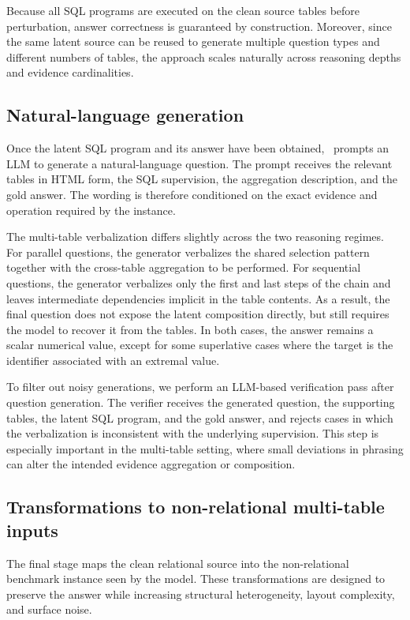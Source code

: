 Because all SQL programs are executed on the clean source tables before perturbation, answer correctness is guaranteed by construction. Moreover, since the same latent source can be reused to generate multiple question types and different numbers of tables, the approach scales naturally across reasoning depths and evidence cardinalities.

\subsection{Natural-language generation}
\label{subsec:nl-generation}

Once the latent SQL program and its answer have been obtained, \name\ prompts an LLM to generate a natural-language question. The prompt receives the relevant tables in HTML form, the SQL supervision, the aggregation description, and the gold answer. The wording is therefore conditioned on the exact evidence and operation required by the instance.

The multi-table verbalization differs slightly across the two reasoning regimes. For parallel questions, the generator verbalizes the shared selection pattern together with the cross-table aggregation to be performed. For sequential questions, the generator verbalizes only the first and last steps of the chain and leaves intermediate dependencies implicit in the table contents. As a result, the final question does not expose the latent composition directly, but still requires the model to recover it from the tables. In both cases, the answer remains a scalar numerical value, except for some superlative cases where the target is the identifier associated with an extremal value.

To filter out noisy generations, we perform an LLM-based verification pass after question generation. The verifier receives the generated question, the supporting tables, the latent SQL program, and the gold answer, and rejects cases in which the verbalization is inconsistent with the underlying supervision. This step is especially important in the multi-table setting, where small deviations in phrasing can alter the intended evidence aggregation or composition.

\subsection{Transformations to non-relational multi-table inputs}
\label{subsec:transformations}

The final stage maps the clean relational source into the non-relational benchmark instance seen by the model. These transformations are designed to preserve the answer while increasing structural heterogeneity, layout complexity, and surface noise.

